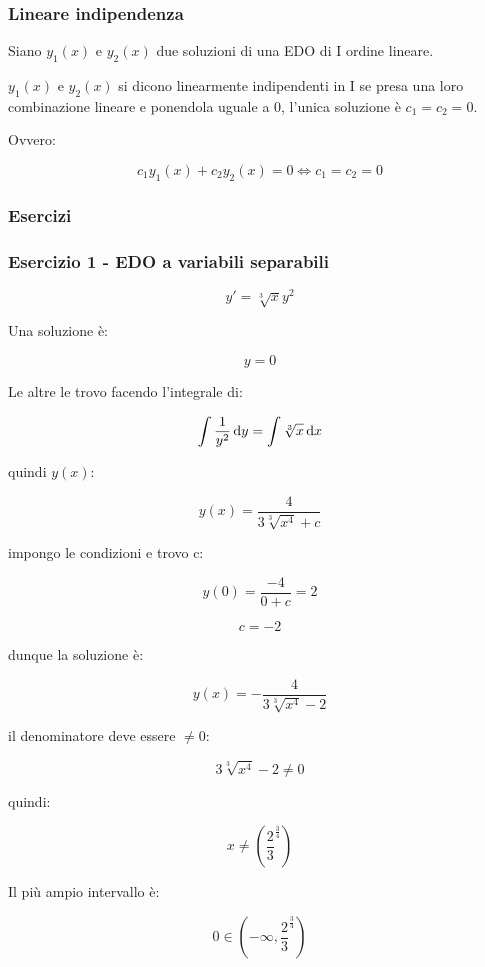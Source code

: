 \pagebreak{}

\subsubsection{Lineare indipendenza}

Siano \(y_1(x)\) e \(y_2(x)\) due soluzioni di una EDO di I ordine lineare.

\(y_1(x)\) e \(y_2(x)\) si dicono linearmente indipendenti in I se presa una loro combinazione lineare e ponendola uguale a 0, l'unica soluzione è \(c_1=c_2=0\).

Ovvero:

\[
    c_1y_1(x) +c_2y_2(x) = 0 \iff c_1=c_2=0
\]

\pagebreak
\subsubsection{Esercizi}

\subsubsection*{Esercizio 1 {-} EDO a variabili separabili}

\[
    y'=\sqrt[3]{x}y^{2}
\]

Una soluzione è:

\[
    y=0
\]

Le altre le trovo facendo l'integrale di:

\[
    \int \frac{1}{y^{2}} \mathop{}\!\mathrm{d} y = \int \sqrt[3]{x} \mathop{}\!\mathrm{d} x
\]

quindi \(y(x)\):

\[
    y(x)  = \frac{4}{3 \sqrt[3]{x^{4}}+c}
\]

impongo le condizioni e trovo c:

\[
    y(0) = \frac{-4}{0+c} = 2
\]

\[
    c = -2
\]

dunque la soluzione è:

\[
    y(x) = -\frac{4}{3 \sqrt[3]{x^{4}} - 2}
\]

il denominatore deve essere \(\neq 0\):

\[
    3 \sqrt[3]{x^{4}} - 2 \neq 0
\]

quindi:

\[
    x \neq (\frac{2}{3}^{ \frac{3}{4}})
\]

Il più ampio intervallo è:

\[
    0 \in \left(-\infty, \frac{2}{3}^{ \frac{3}{4}}\right)
\]

